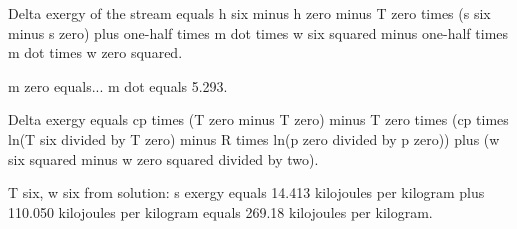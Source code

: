 Delta exergy of the stream equals h six minus h zero minus T zero times (s six minus s zero) plus one-half times m dot times w six squared minus one-half times m dot times w zero squared.  

m zero equals...  
m dot equals 5.293.  

Delta exergy equals cp times (T zero minus T zero) minus T zero times (cp times ln(T six divided by T zero) minus R times ln(p zero divided by p zero)) plus (w six squared minus w zero squared divided by two).  

T six, w six from solution:  
s exergy equals 14.413 kilojoules per kilogram plus 110.050 kilojoules per kilogram equals 269.18 kilojoules per kilogram.